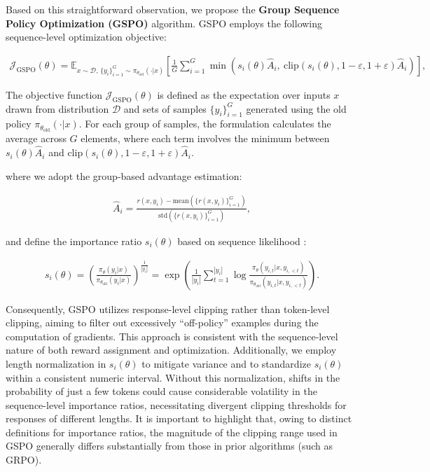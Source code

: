 Based on this straightforward observation, we propose the \textbf{Group Sequence Policy Optimization (GSPO)} algorithm. GSPO employs the following sequence-level optimization objective:

\begin{align}
\mathcal{J}_\text{GSPO} (\theta) =
\mathbb{E}_{ x \sim \mathcal{D},\, \{y_i\}_{i=1}^G \sim \pi_{\theta_\text{old}}( \cdot | x) }
\left[ 
\frac{1}{G} \sum_{i=1}^{G}
\min \left( s_{i}(\theta)  \widehat{A}_{i},\ \mathrm{clip} \left( s_{i}(\theta), 1 - {\varepsilon}, 1 + {\varepsilon} \right) \widehat{A}_{i} \right) 
\right],
\label{equ:gspo}
\end{align}

The objective function $\mathcal{J}_\text{GSPO} (\theta)$ is defined as the expectation over inputs $x$ drawn from distribution $\mathcal{D}$ and sets of samples $\{y_i\}_{i=1}^G$ generated using the old policy $\pi_{\theta_\text{old}}(\cdot|x)$. For each group of samples, the formulation calculates the average across $G$ elements, where each term involves the minimum between $s_{i}(\theta) \widehat{A}_{i}$ and $\mathrm{clip}(s_{i}(\theta), 1-{\varepsilon}, 1+{\varepsilon}) \widehat{A}_{i}$.

where we adopt the group-based advantage estimation:

\begin{align}
\widehat{A}_{i} = \frac{r(x, y_i) - \mathrm{mean} \left( \{ r(x, y_i) \}_{i=1}^G \right) }{ \mathrm{std} \left( \{ r(x, y_i) \}_{i=1}^G \right) },
\end{align}

and define the importance ratio $s_{i}(\theta)$ based on sequence likelihood \citep{click}:

\begin{align}
s_{i}(\theta) = \left( \frac{ \pi_{\theta} (y_i | x) }{ \pi_{\theta_\text{old}} (y_i | x)} \right)^{\frac{1}{|y_i|}}
=
\exp \left( \frac{1}{|y_i|} \sum_{t=1}^{|y_i|} \log \frac{ \pi_{\theta} (y_{i,t} | x, y_{i,<t}) }{ \pi_{\theta_\text{old}} (y_{i,t} | x,y_{i,<t})} \right).
\end{align}

Consequently, GSPO utilizes response-level clipping rather than token-level clipping, aiming to filter out excessively ``off-policy'' examples during the computation of gradients. This approach is consistent with the sequence-level nature of both reward assignment and optimization. Additionally, we employ length normalization in $s_{i}(\theta)$ to mitigate variance and to standardize $s_{i}(\theta)$ within a consistent numeric interval. Without this normalization, shifts in the probability of just a few tokens could cause considerable volatility in the sequence-level importance ratios, necessitating divergent clipping thresholds for responses of different lengths. It is important to highlight that, owing to distinct definitions for importance ratios, the magnitude of the clipping range used in GSPO generally differs substantially from those in prior algorithms (such as GRPO).

